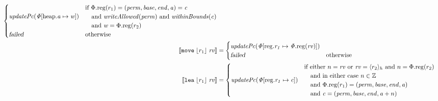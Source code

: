\documentclass{article}
\newcommand{\update}[2]{[#1 \mapsto #2]}
\newcommand{\sem}[1]{\left\llbracket #1 \right\rrbracket}
\newcommand{\var}[1]{\mathit{#1}}
\newcommand{\rv}{\var{rv}}
\newcommand{\addr}{\var{a}}
\newcommand{\start}{\var{base}}
\newcommand{\addrend}{\var{end}}
\newcommand{\perm}{\var{perm}}
\newcommand{\stdcap}[1][\perm]{\left(#1,\start,\addrend,\addr \right)}
\newcommand{\plainproj}[1]{\mathrm{#1}}
\newcommand{\memreg}[1][\Phi]{#1.\plainproj{reg}}
\newcommand{\updateHeap}[3][\Phi]{#1\update{\plainproj{heap}.#2}{#3}}
\newcommand{\updateReg}[3][\Phi]{#1\update{\plainproj{reg}.#2}{#3}}
\newcommand{\failed}{\textsl{failed}}
\newcommand{\plainfun}[1]{\mathit{#1}}
\newcommand{\writeAllowed}[1]{\plainfun{writeAllowed}(#1)}
\newcommand{\withinBounds}[1]{\plainfun{withinBounds}(#1)}
\newcommand{\stdUpdatePc}[1]{\plainfun{updatePc(#1)}}
\newcommand{\ints}{\mathbb{Z}}
\newcommand{\refreg}[1]{\lfloor #1 \rfloor}
\newcommand{\refheap}[1]{\langle #1 \rangle_h}
\newcommand{\instr}[1]{\mathtt{#1}}
\newcommand{\twoinstr}[3]{\instr{#1} \; #2 \; #3}
\newcommand{\move}[2]{\twoinstr{move}{#1}{#2}}
\newcommand{\lea}[2]{\twoinstr{lea}{#1}{#2}}
\begin{document}
\begin{align*}
                                             \begin{cases}
                                               \stdUpdatePc{\updateHeap{\addr}{\var{w}}} &
                                               \arraycolsep=0pt
                                               \begin{array}{l}
                                                 \text{if }\memreg(r_1) = (\perm,\start,\addrend,\addr) = \var{c} \\
                                                 \quad\text{and }\writeAllowed{\perm} \text{ and } \withinBounds{\var{c}} \\
                                                 \quad\text{and }\var{w} = \memreg(r_2)
                                               \end{array}\\
                                               \failed & \text{otherwise }
                                             \end{cases}\\
 \sem{\move{\refreg{r_1}}{\rv}}            & = \begin{cases}
                                                 \stdUpdatePc{\updateReg{r_1}{\memreg(\rv)}} & \\ %
                                                 \failed   & \text{otherwise }
                                 \end{cases}
\\
  \sem{\lea{\refreg{r_1}}{\rv}}            & =
                                             \begin{cases}
                                               \stdUpdatePc{\updateReg{r_1}{\var{c}}} &
                                                 \arraycolsep=0pt
                                                 \begin{array}{l}
                                                   \text{if either $n = \rv$ or $\rv = \refheap{r_2}$ and $n = \memreg(r_2)$} \\
                                                   \quad\text{and in either case $n \in \ints $} \\
                                                   \quad\text{and $\memreg(r_1) = \stdcap$}\\
                                                   \quad\text{and $\var{c} = (\perm,\start,\addrend,\addr + n)$}

\end{array}
\end{cases}
\end{align*}
\end{document}
